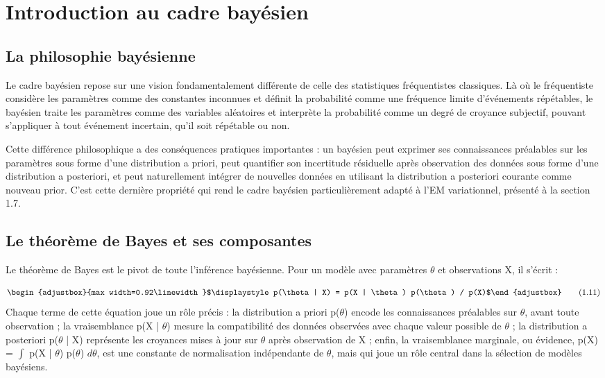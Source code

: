 \section{Introduction au cadre bayésien}
\subsection{La philosophie bayésienne}
Le cadre bayésien repose sur une vision fondamentalement différente de celle des statistiques fréquentistes classiques. Là où le fréquentiste considère les paramètres comme des constantes inconnues et définit la probabilité comme une fréquence limite d'événements répétables, le bayésien traite les paramètres comme des variables aléatoires et interprète la probabilité comme un degré de croyance subjectif, pouvant s'appliquer à tout événement incertain, qu'il soit répétable ou non.

Cette différence philosophique a des conséquences pratiques importantes : un bayésien peut exprimer ses connaissances préalables sur les paramètres sous forme d'une distribution a priori, peut quantifier son incertitude résiduelle après observation des données sous forme d'une distribution a posteriori, et peut naturellement intégrer de nouvelles données en utilisant la distribution a posteriori courante comme nouveau prior. C'est cette dernière propriété qui rend le cadre bayésien particulièrement adapté à l'EM variationnel, présenté à la section 1.7.

\subsection{Le théorème de Bayes et ses composantes}
Le théorème de Bayes est le pivot de toute l'inférence bayésienne. Pour un modèle avec paramètres $\theta $ et observations X, il s'écrit :

\begin{equation}
\begin{adjustbox}{max width=0.92\linewidth}$\displaystyle p(\theta  | X) = p(X | \theta ) p(\theta ) / p(X)$\end{adjustbox}
\tag{1.11}
\label{eq:1_11}
\end{equation}
Chaque terme de cette équation joue un rôle précis : la distribution a priori p($\theta $) encode les connaissances préalables sur $\theta $, avant toute observation ; la vraisemblance p(X | $\theta $) mesure la compatibilité des données observées avec chaque valeur possible de $\theta $ ; la distribution a posteriori p($\theta $ | X) représente les croyances mises à jour sur $\theta $ après observation de X ; enfin, la vraisemblance marginale, ou évidence, p(X) = $\int $ p(X | $\theta $) p($\theta $) $d\theta $, est une constante de normalisation indépendante de $\theta $, mais qui joue un rôle central dans la sélection de modèles bayésiens.

